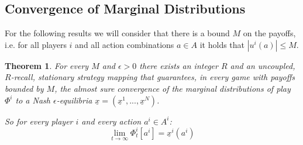 \documentclass[a4paper]{article}
\theoremstyle{plain}
\newtheorem{theorem}{Theorem}
\theoremstyle{remark}
\newcommand{\eq}[1]{\underline{#1}}
\begin{document}
\subsection{Convergence of Marginal Distributions}

For the following results we will consider that there is a bound $M$ on the payoffs, i.e. for all players $i$ and 
all action combinations $a \in A$ it holds that $|u^i(a)| \leq M$.

\begin{theorem}
\label{th:marginal}
	For every $M$ and $\epsilon > 0$ there exists an integer $R$ and an uncoupled, $R$-recall,
	stationary strategy mapping that guarantees, in every game with payoffs bounded by $M$, the
	almost sure convergence of the marginal distributions of play $\Phi^i$ to a Nash $\epsilon$-equilibria
	$\eq{x} = (\eq{x}^1, ..., \eq{x}^N)$.
	
	\medskip
	So for every player $i$ and every action $a^i \in A^i$:
	\[
		\lim_{t \to \infty} \Phi_t^i[a^i] = \eq{x}^i(a^i)
	\]
\end{theorem}
\end{document}
